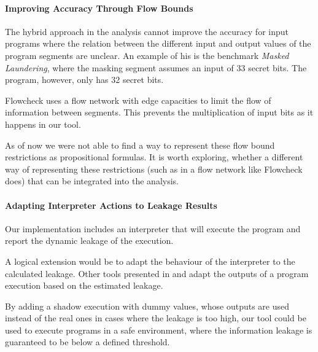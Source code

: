 \paragraph{Improving Accuracy Through Flow Bounds}
The hybrid approach in the analysis cannot improve the accuracy for input programs where the relation between the different input and output values of the program segments are unclear. An example of his is the benchmark \emph{Masked Laundering}, where the masking segment assumes an input of 33 secret bits. The program, however, only has 32 secret bits.

Flowcheck \cite{mccamant08} uses a flow network with edge capacities to limit the flow of information between segments. This prevents the multiplication of input bits as it happens in our tool.

As of now we were not able to find a way to represent these flow bound restrictions as propositional formulas. It is worth exploring, whether a different way of representing these restrictions (such as in a flow network like Flowcheck does) that can be integrated into the analysis.

\paragraph{Adapting Interpreter Actions to Leakage Results}
Our implementation includes an interpreter that will execute the program and report the dynamic leakage of the execution.

A logical extension would be to adapt the behaviour of the interpreter to the calculated leakage. Other tools presented in \cite{devriese10} and \cite{austin17} adapt the outputs of a program execution based on the estimated leakage.

By adding a shadow execution with dummy values, whose outputs are used instead of the real ones in cases where the leakage is too high, our tool could be used to execute programs in a safe environment, where the information leakage is guaranteed to be below a defined threshold. 